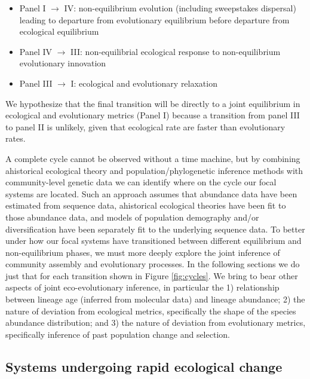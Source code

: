 \documentclass[12pt]{article}
\begin{document}
\begin{itemize}
\item Panel I $\rightarrow$ IV: non-equilibrium evolution (including
  sweepstakes dispersal) leading to departure from evolutionary
  equilibrium before departure from ecological equilibrium
\item Panel IV $\rightarrow$ III: non-equilibrial ecological response
  to non-equilibrium evolutionary innovation
\item Panel III $\rightarrow$ I: ecological and evolutionary
  relaxation
\end{itemize}

We hypothesize that the final transition will be directly to a joint
equilibrium in ecological and evolutionary metrics (Panel I) because a
transition from panel III to panel II is unlikely, given that
ecological rate are faster than evolutionary rates.

A complete cycle cannot be observed without a time machine, but by
combining ahistorical ecological theory and population/phylogenetic
inference methods with community-level genetic data we can identify
where on the cycle our focal systems are located. Such an approach
assumes that abundance data have been estimated from sequence data,
ahistorical ecological theories have been fit to those abundance data,
and models of population demography and/or diversification have been
separately fit to the underlying sequence data. To better under how
our focal systems have transitioned between different equilibrium and
non-equilibrium phases, we must more deeply explore the joint
inference of community assembly and evolutionary processes. In the
following sections we do just that for each transition shown in Figure
\ref{fig:cycles}. We bring to bear other aspects of joint
eco-evolutionary inference, in particular the 1) relationship between
lineage age (inferred from molecular data) and lineage abundance; 2)
the nature of deviation from ecological metrics, specifically the
shape of the species abundance distribution; and 3) the nature of
deviation from evolutionary metrics, specifically inference of past
population change and selection.

\subsection{Systems undergoing rapid ecological change}
\end{document}
